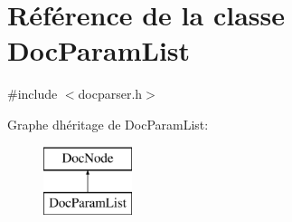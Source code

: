 \hypertarget{class_doc_param_list}{}\section{Référence de la classe Doc\+Param\+List}
\label{class_doc_param_list}


{\ttfamily \#include $<$docparser.\+h$>$}

Graphe d\textquotesingle{}héritage de Doc\+Param\+List\+:\begin{figure}[H]
\begin{center}
\leavevmode
\includegraphics[height=2.000000cm]{class_doc_param_list}
\end{center}
\end{figure}
